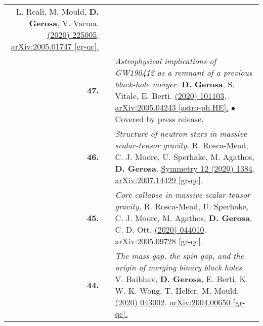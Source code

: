 {\begin{longtable}{rp{0.3cm}p{15.8cm}}
\newline{}
L. Reali, M. Mould, \textbf{D. Gerosa}, V. Varma.
\newline{}
\href{https://iopscience.iop.org/article/10.1088/1361-6382/abb639/meta}{\cqg 37 (2020) 225005}. \href{https://arxiv.org/abs/2005.01747}{arXiv:2005.01747 [gr-qc].}
\vspace{0.09cm}\\
%
\textbf{47.} & & \textit{Astrophysical implications of GW190412 as a remnant of a previous black-hole merger.}
\newline{}
\textbf{D. Gerosa}, S. Vitale, E. Berti.
\newline{}
\href{https://journals.aps.org/prl/abstract/10.1103/PhysRevLett.125.101103}{\prl 125 (2020) 101103}. \href{https://arxiv.org/abs/2005.04243}{arXiv:2005.04243 [astro-ph.HE].}
\newline{}
\textcolor{color1}{$\bullet$} Covered by press release.
\vspace{0.09cm}\\
%
\textbf{46.} & & \textit{Structure of neutron stars in massive scalar-tensor gravity.}
\newline{}
R. Rosca-Mead, C. J. Moore, U. Sperhake, M. Agathos, \textbf{D. Gerosa}.
\newline{}
\href{https://www.mdpi.com/2073-8994/12/9/1384}{Symmetry 12 (2020) 1384}. \href{https://arxiv.org/abs/2007.14429}{arXiv:2007.14429 [gr-qc].}
\vspace{0.09cm}\\
%
\textbf{45.} & & \textit{Core collapse in massive scalar-tensor gravity.}
\newline{}
R. Rosca-Mead, U. Sperhake, C. J. Moore, M. Agathos, \textbf{D. Gerosa}, C. D. Ott.
\newline{}
\href{https://journals.aps.org/prd/abstract/10.1103/PhysRevD.102.044010}{\prd 102 (2020) 044010}. \href{https://arxiv.org/abs/2005.09728}{arXiv:2005.09728 [gr-qc].}
\vspace{0.09cm}\\
%
\textbf{44.} & & \textit{The mass gap, the spin gap, and the origin of merging binary black holes.}
\newline{}
V. Baibhav, \textbf{D. Gerosa}, E. Berti, K. W. K. Wong, T. Helfer, M. Mould.
\newline{}
\href{https://journals.aps.org/prd/abstract/10.1103/PhysRevD.102.043002}{\prd 102 (2020) 043002}. \href{https://arxiv.org/abs/2004.00650}{arXiv:2004.00650 [gr-qc].}
\vspace{0.09cm}\\

\end{longtable}}
